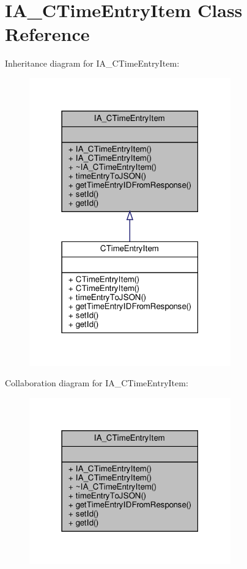 \hypertarget{classIA__CTimeEntryItem}{}\section{I\+A\+\_\+\+C\+Time\+Entry\+Item Class Reference}
\label{classIA__CTimeEntryItem}


Inheritance diagram for I\+A\+\_\+\+C\+Time\+Entry\+Item\+:
\nopagebreak
\begin{figure}[H]
\begin{center}
\leavevmode
\includegraphics[width=247pt]{classIA__CTimeEntryItem__inherit__graph}
\end{center}
\end{figure}


Collaboration diagram for I\+A\+\_\+\+C\+Time\+Entry\+Item\+:
\nopagebreak
\begin{figure}[H]
\begin{center}
\leavevmode
\includegraphics[width=247pt]{classIA__CTimeEntryItem__coll__graph}
\end{center}
\end{figure}
